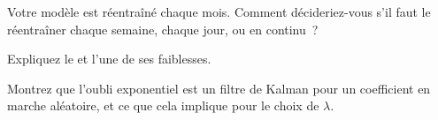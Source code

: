 \begin{interviewq}\label{iq:ml:online-learning-and-drift:4}
Votre modèle est réentraîné chaque mois. Comment décideriez-vous s'il faut le réentraîner chaque semaine, chaque jour, ou en continu~?
\end{interviewq}

\begin{interviewq}\label{iq:ml:online-learning-and-drift:5}
Expliquez le  et l'une de ses faiblesses.
\end{interviewq}

\begin{interviewq}\label{iq:ml:online-learning-and-drift:6}
Montrez que l'oubli exponentiel est un filtre de Kalman pour un coefficient en marche aléatoire, et ce que cela implique pour le choix de
$\lambda$.
\end{interviewq}
